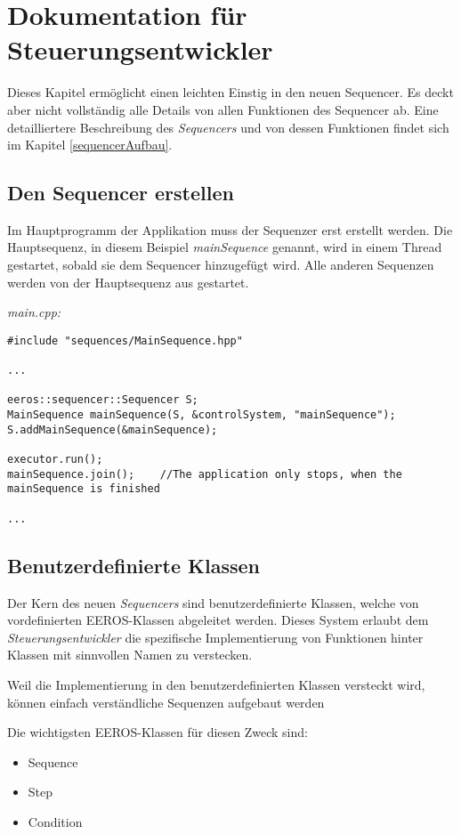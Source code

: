 \chapter{Dokumentation für Steuerungsentwickler}
Dieses Kapitel ermöglicht einen leichten Einstig in den neuen Sequencer.
Es deckt aber nicht vollständig alle Details von allen Funktionen des Sequencer ab.
Eine detailliertere Beschreibung des \textit{Sequencers} und von dessen Funktionen findet sich im Kapitel \ref{sequencerAufbau}.


\section{Den Sequencer erstellen}
Im Hauptprogramm der Applikation muss der Sequenzer erst erstellt werden.
Die Hauptsequenz, in diesem Beispiel \textit{mainSequence} genannt, wird in einem Thread gestartet, sobald sie dem Sequencer hinzugefügt wird.
Alle anderen Sequenzen werden von der Hauptsequenz aus gestartet.

\textit{main.cpp:}\
\begin{lstlisting}
#include "sequences/MainSequence.hpp"

...

eeros::sequencer::Sequencer S;
MainSequence mainSequence(S, &controlSystem, "mainSequence");
S.addMainSequence(&mainSequence);

executor.run();
mainSequence.join();	//The application only stops, when the mainSequence is finished

...
\end{lstlisting}


\section{Benutzerdefinierte Klassen}
Der Kern des neuen \textit{Sequencers} sind benutzerdefinierte Klassen, welche von vordefinierten EEROS-Klassen abgeleitet werden.
Dieses System erlaubt dem \textit{Steuerungsentwickler} die spezifische Implementierung von Funktionen hinter Klassen mit sinnvollen Namen zu verstecken.

Weil die Implementierung in den benutzerdefinierten Klassen versteckt wird, können einfach verständliche Sequenzen aufgebaut werden

Die wichtigsten EEROS-Klassen für diesen Zweck sind:
\begin{itemize}
\item Sequence
\item Step
\item Condition
\end{itemize}

